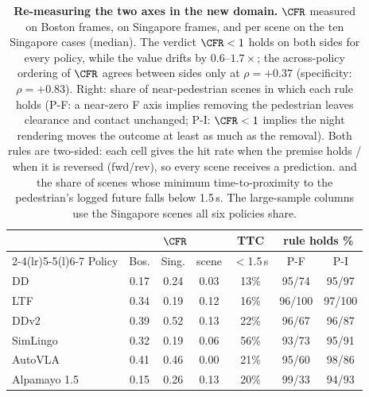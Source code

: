 \begin{table}[t]
\centering
\caption{\textbf{Re-measuring the two axes in the new domain.} $\CFR$ measured on Boston frames, on Singapore frames, and per scene on the ten Singapore cases (median). The verdict $\CFR<1$ holds on both sides for every policy, while the value drifts by $0.6$--$1.7\times$; the across-policy ordering of $\CFR$ agrees between sides only at $\rho={+}0.37$ (specificity: $\rho={+}0.83$). Right: share of near-pedestrian scenes in which each rule holds (P-F: a near-zero F axis implies removing the pedestrian leaves clearance and contact unchanged; P-I: $\CFR<1$ implies the night rendering moves the outcome at least as much as the removal). Both rules are two-sided: each cell gives the hit rate when the premise holds / when it is reversed (fwd/rev), so every scene receives a prediction. and the share of scenes whose minimum time-to-proximity to the pedestrian's logged future falls below 1.5\,s. The large-sample columns use the \NumComN{} Singapore scenes all six policies share.}
\label{tab:axes}
\scriptsize
\setlength{\tabcolsep}{2.5pt}
\begin{tabular}{@{}lcccccc@{}}
\toprule
 & \multicolumn{3}{c}{$\CFR$} & TTC & \multicolumn{2}{c}{rule holds \%} \\
\cmidrule(lr){2-4}\cmidrule(lr){5-5}\cmidrule(l){6-7}
Policy & Bos. & Sing. & scene & $<$1.5\,s & P-F & P-I \\
\midrule
DD & 0.17 & 0.24 & 0.03 & 13\% & 95/74 & 95/97 \\
LTF & 0.34 & 0.19 & 0.12 & 16\% & 96/100 & 97/100 \\
DDv2 & 0.39 & 0.52 & 0.13 & 22\% & 96/67 & 96/87 \\
SimLingo & 0.32 & 0.19 & 0.06 & 56\% & 93/73 & 95/91 \\
AutoVLA & 0.41 & 0.46 & 0.00 & 21\% & 95/60 & 98/86 \\
Alpamayo 1.5 & 0.15 & 0.26 & 0.13 & 20\% & 99/33 & 94/93 \\
\bottomrule
\end{tabular}
\end{table}
